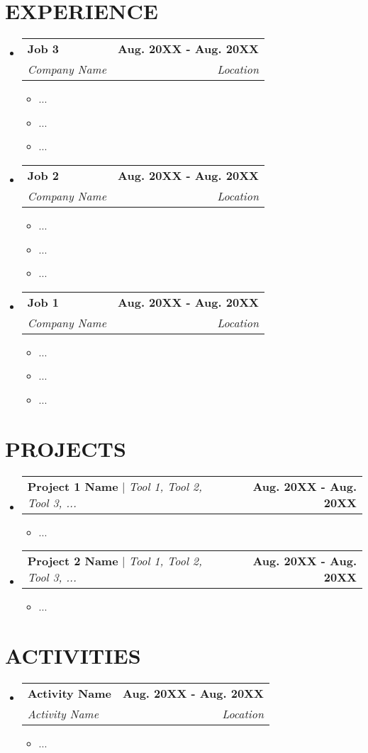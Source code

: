 \documentclass[letterpaper,12pt]{article} %
\makeatletter
\newcommand{\resumeItem}[1]{
  \item\small{
    {#1 \vspace{-2pt}}
  }
}
\newcommand{\resumeSubheading}[4]{
  \vspace{-2pt}\item
    \begin{tabular*}{0.97\textwidth}[t]{l@{\extracolsep{\fill}}r}
      \textbf{#1} & #2 \\
      \textit{\small#3} & \textit{\small #4} \\
    \end{tabular*}\vspace{-7pt}
}
\newcommand{\resumeProjectHeading}[2]{
    \item
    \begin{tabular*}{0.97\textwidth}{l@{\extracolsep{\fill}}r}
      \small#1 & #2 \\
    \end{tabular*}\vspace{-7pt}
}
\newcommand{\resumeSubHeadingListStart}{\begin{itemize}[leftmargin=0.15in, label={}]}
\newcommand{\resumeSubHeadingListEnd}{\end{itemize}}
\newcommand{\resumeItemListStart}{\begin{itemize}}
\newcommand{\resumeItemListEnd}{\end{itemize}\vspace{-5pt}}
\makeatother
\begin{document}
\section{\textbf{EXPERIENCE}}
  \resumeSubHeadingListStart
    \resumeSubheading
      {Job 3}{\textbf{Aug. 20XX - Aug. 20XX}}
      {Company Name}{Location}
      \resumeItemListStart
        \resumeItem{...}
        \resumeItem{...}
        \resumeItem{...}
    \resumeItemListEnd
    \resumeSubheading
      {Job 2}{\textbf{Aug. 20XX - Aug. 20XX}}
      {Company Name}{Location}
      \resumeItemListStart
        \resumeItem{...}
        \resumeItem{...}
        \resumeItem{...}
    \resumeItemListEnd
    \resumeSubheading
      {Job 1}{\textbf{Aug. 20XX - Aug. 20XX}}
      {Company Name}{Location}
      \resumeItemListStart
        \resumeItem{...}
        \resumeItem{...}
        \resumeItem{...}
    \resumeItemListEnd
  \resumeSubHeadingListEnd
\section{\textbf{PROJECTS}}
    \resumeSubHeadingListStart
      \resumeProjectHeading
          {\textbf{Project 1 Name} $|$ \emph{Tool 1, Tool 2, Tool 3, ...}}{\textbf{Aug. 20XX - Aug. 20XX}}
          \resumeItemListStart
            \resumeItem{...}
      \resumeItemListEnd
      \vspace{-0.3em}
            \resumeProjectHeading
          {\textbf{Project 2 Name} $|$ \emph{Tool 1, Tool 2, Tool 3, ...}}{\textbf{Aug. 20XX - Aug. 20XX}}
          \resumeItemListStart
            \resumeItem{...}
      \resumeItemListEnd
    \resumeSubHeadingListEnd
\section{\textbf{ACTIVITIES}}
  \resumeSubHeadingListStart
    \resumeSubheading
      {Activity Name}{\bfseries{Aug. 20XX - Aug. 20XX}}
      {Activity Name}{Location}
      \resumeItemListStart
        \vspace{0.3em}
        \resumeItem{...}
        \vspace{0.3em}
    \resumeItemListEnd
  \resumeSubHeadingListEnd
\end{document}
